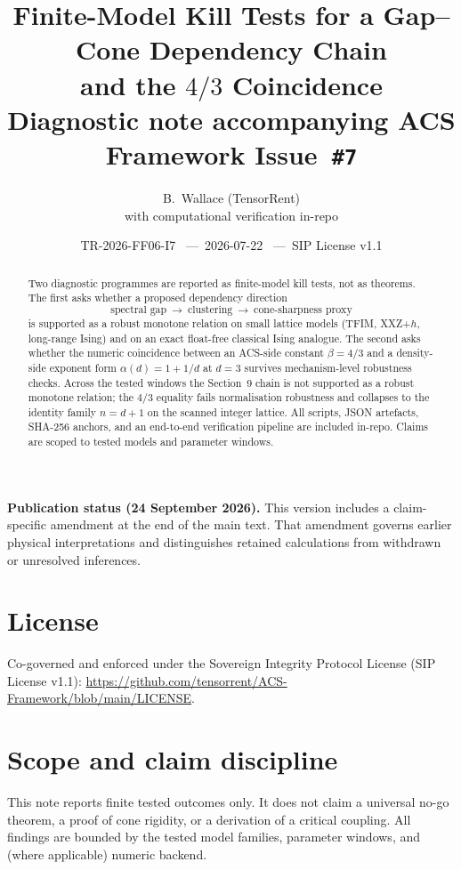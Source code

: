 \documentclass[11pt]{article}
\title{\textbf{Finite-Model Kill Tests for a Gap--Cone Dependency Chain\\
and the $4/3$ Coincidence}\\[0.35em]
\large Diagnostic note accompanying ACS Framework Issue~\texttt{\#7}}
\author{B.\ Wallace \quad (TensorRent)\\ \small with computational verification in-repo}
\date{\small TR-2026-FF06-I7 \ ---\ 2026-07-22 \ ---\ SIP License v1.1}
\begin{document}
\maketitle

\begin{abstract}
Two diagnostic programmes are reported as finite-model kill tests, not
as theorems.  The first asks whether a proposed dependency direction
\[
  \text{spectral gap}\ \to\ \text{clustering}\ \to\ \text{cone-sharpness proxy}
\]
is supported as a robust monotone relation on small lattice models
(TFIM, XXZ+$h$, long-range Ising) and on an exact float-free classical
Ising analogue.  The second asks whether the numeric coincidence between
an ACS-side constant $\beta=4/3$ and a density-side exponent form
$\alpha(d)=1+1/d$ at $d=3$ survives mechanism-level robustness checks.
Across the tested windows the Section~9 chain is not supported as a
robust monotone relation; the $4/3$ equality fails normalisation
robustness and collapses to the identity family $n=d+1$ on the scanned
integer lattice.  All scripts, JSON artefacts, SHA-256 anchors, and an
end-to-end verification pipeline are included in-repo.  Claims are
scoped to tested models and parameter windows.
\end{abstract}
\par\smallskip\noindent\textbf{Publication status (24 September 2026).}
This version includes a claim-specific amendment at the end of the main text.
That amendment governs earlier physical interpretations and distinguishes
retained calculations from withdrawn or unresolved inferences.\par\smallskip


\section*{License}
Co-governed and enforced under the
Sovereign Integrity Protocol License (SIP License v1.1):
\url{https://github.com/tensorrent/ACS-Framework/blob/main/LICENSE}.

\section{Scope and claim discipline}

This note reports finite tested outcomes only.  It does not claim a
universal no-go theorem, a proof of cone rigidity, or a derivation of a
critical coupling.  All findings are bounded by the tested model
families, parameter windows, and (where applicable) numeric backend.
\end{document}
